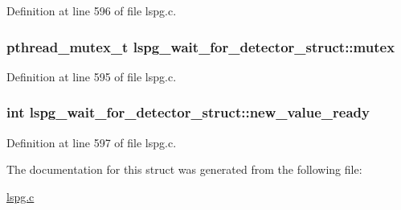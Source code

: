 Definition at line 596 of file lspg.c.\hypertarget{structlspg__wait__for__detector__struct_a958e9fe59e671e61f95c2ce796ba24ce}{
\subsubsection[{mutex}]{\setlength{\rightskip}{0pt plus 5cm}pthread\_\-mutex\_\-t {\bf lspg\_\-wait\_\-for\_\-detector\_\-struct::mutex}}}
\label{structlspg__wait__for__detector__struct_a958e9fe59e671e61f95c2ce796ba24ce}


Definition at line 595 of file lspg.c.\hypertarget{structlspg__wait__for__detector__struct_ad950e85c70c4473c5c7c40f8ceeae61d}{
\subsubsection[{new\_\-value\_\-ready}]{\setlength{\rightskip}{0pt plus 5cm}int {\bf lspg\_\-wait\_\-for\_\-detector\_\-struct::new\_\-value\_\-ready}}}
\label{structlspg__wait__for__detector__struct_ad950e85c70c4473c5c7c40f8ceeae61d}


Definition at line 597 of file lspg.c.

The documentation for this struct was generated from the following file:\begin{DoxyCompactItemize}
\item 
\hyperlink{lspg_8c}{lspg.c}\end{DoxyCompactItemize}
